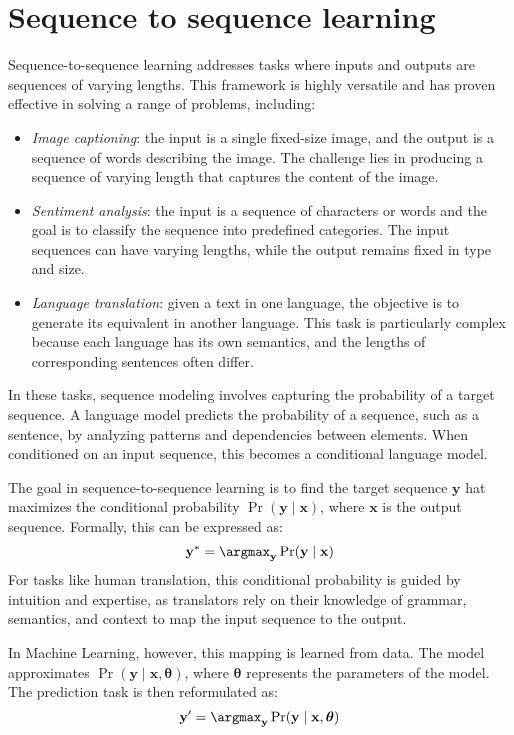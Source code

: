 \section{Sequence to sequence learning}

Sequence-to-sequence learning addresses tasks where inputs and outputs are sequences of varying lengths. 
This framework is highly versatile and has proven effective in solving a range of problems, including:
\begin{itemize}
    \item \textit{Image captioning}: the input is a single fixed-size image, and the output is a sequence of words describing the image. 
        The challenge lies in producing a sequence of varying length that captures the content of the image.
    \item \textit{Sentiment analysis}: the input is a sequence of characters or words and the goal is to classify the sequence into predefined categories. 
        The input sequences can have varying lengths, while the output remains fixed in type and size.
    \item \textit{Language translation}: given a text in one language, the objective is to generate its equivalent in another language.
        This task is particularly complex because each language has its own semantics, and the lengths of corresponding sentences often differ.
\end{itemize}
In these tasks, sequence modeling involves capturing the probability of a target sequence. 
A language model predicts the probability of a sequence, such as a sentence, by analyzing patterns and dependencies between elements. 
When conditioned on an input sequence, this becomes a conditional language model.

The goal in sequence-to-sequence learning is to find the target sequence $\mathbf{y}$ hat maximizes the conditional probability $\Pr(\mathbf{y}\mid\mathbf{x})$, where $\mathbf{x}$ is the output sequence. 
Formally, this can be expressed as:
\[\mathbf{y}^\ast=\argmax_\mathbf{y}\Pr(\mathbf{y}\mid\mathbf{x})\]
For tasks like human translation, this conditional probability is guided by intuition and expertise, as translators rely on their knowledge of grammar, semantics, and context to map the input sequence to the output.

In Machine Learning, however, this mapping is learned from data.
The model approximates $\Pr(\mathbf{y}\mid\mathbf{x},\boldsymbol{\theta})$, where $\boldsymbol{\theta}$ represents the parameters of the model. 
The prediction task is then reformulated as:
\[\mathbf{y}^\prime=\argmax_\mathbf{y}\Pr(\mathbf{y}\mid\mathbf{x},\boldsymbol{\theta})\]

